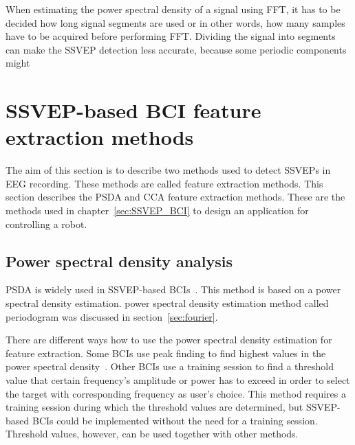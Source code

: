 When estimating the \gls{power spectral density} of a signal using \gls{FFT}, it has to be decided how long signal segments are used or in other words, how many samples have to be acquired before performing \gls{FFT}. Dividing the signal into segments can make the \gls{SSVEP} detection less accurate, because some periodic components might

\section{SSVEP-based BCI feature extraction methods}
\label{sec:SSVEP_detection}
The aim of this section is to describe two methods used to detect \glspl{SSVEP} in \gls{EEG} recording. These methods are called \gls{feature extraction} methods. This section describes the \gls{PSDA} and \gls{CCA} \gls{feature extraction} methods. These are the methods used in chapter~\ref{sec:SSVEP_BCI} to design an application for controlling a robot. %

\subsection{Power spectral density analysis}

\Gls{PSDA} is widely used in \gls{SSVEP}-based \glspl{BCI}~\cite{bin2009cca}. This method is based on a \gls{power spectral density} estimation. \Gls{power spectral density} estimation method called \gls{periodogram} was discussed in section~\ref{sec:fourier}.

There are different ways how to use the \gls{power spectral density} estimation for \gls{feature extraction}. Some \glspl{BCI} use peak finding to find highest values in the \gls{power spectral density}~\cite{cca_lin}. Other \glspl{BCI} use a training session to find a threshold value that certain frequency's amplitude or power has to exceed in order to select the \gls{target} with corresponding frequency as user's choice. This method requires a training session during which the threshold values are determined, but \gls{SSVEP}-based \glspl{BCI} could be implemented without the need for a training session. Threshold values, however, can be used together with other methods. 


